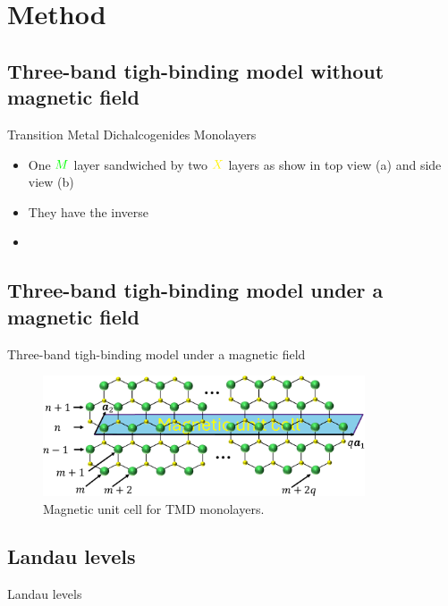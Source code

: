 \documentclass[aspectratio=169]{beamer}
\begin{document}
	\section{Method}
	\subsection{Three-band tigh-binding model without magnetic field}
	\begin{frame}{Transition Metal Dichalcogenides Monolayers}
		\begin{itemize}
			\item One $\color{green}M$ layer sandwiched by two $\color{yellow}X$ layers as show in top view (a) and side view (b)
			\item They have the inverse 
		\end{itemize}
	\end{frame}
	\begin{frame}
		\begin{itemize}
			\item 
		\end{itemize}
	\end{frame}
	\subsection{Three-band tigh-binding model under a magnetic field}
	\begin{frame}{Three-band tigh-binding model under a magnetic field}
		\begin{figure}
			\centering
			\includegraphics[width=0.85\textwidth,height=0.35\linewidth]{pic/magneticUC_cut.pdf}
			\caption{\label{fig:Mag UC} Magnetic unit cell for TMD monolayers.}
		\end{figure}
	\end{frame}
	\subsection{Landau levels}
	\begin{frame}{Landau levels}
	\end{frame}
\end{document}
